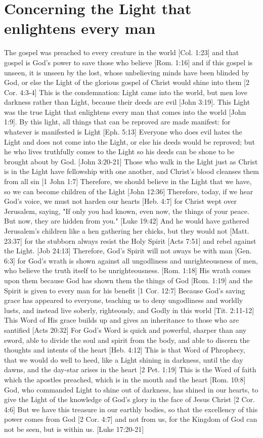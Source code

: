 \documentclass[../main.tex]{subfiles}
\begin{document}
	\section{Concerning the Light that enlightens every man}

	The gospel was preached to every creature in the world [Col. 1:23] and that gospel is God's power to save those who believe [Rom. 1:16] and if this gospel is unseen, it is unseen by the lost, whose unbelieving minds have been blinded by God, or else the Light of the glorious gospel of Christ would shine into them [2 Cor. 4:3-4] This is the condemnation: Light came into the world, but men love darkness rather than Light, because their deeds are evil [John 3:19]. This Light was the true Light that enlightens every man that comes into the world [John 1:9]. By this light, all things that can be reproved are made manifest: for whatever is manifested is Light [Eph. 5:13] Everyone who does evil hates the Light and does not come into the Light, or else his deeds would be reproved; but he who lives truthfully comes to the Light so his deeds can be shone to be brought about by God. [John 3:20-21] Those who walk in the Light just as Christ is in the Light have fellowship with one another, and Christ's blood cleanses them from all sin [1 John 1:7] Therefore, we should believe in the Light that we have, so we can become children of the Light [John 12:36] Therefore, today, if we hear God's voice, we must not harden our hearts [Heb. 4:7] for Christ wept over Jerusalem, saying, "If only you had known, even now,  the things of your peace. But now, they are hidden from you." [Luke 19:42] And he would have gathered Jerusalem's children like a hen gathering her chicks, but they would not [Matt. 23:37] for the stubborn always resist the Holy Spirit [Acts 7:51] and rebel against the Light. [Job 24:13] Therefore, God's Spirit will not aways be with man [Gen. 6:3] for God's wrath is shown against all ungodliness and unrighteousness of men, who believe the truth itself to be unrighteousness. [Rom. 1:18] His wrath comes upon them because God has shown them the things of God [Rom. 1:19] and the Spirit is given to every man for his benefit [1 Cor. 12:7] Because God's saving grace has appeared to everyone, teaching us to deny ungodliness and worldly lusts, and instead live soberly, righteously, and Godly in this world [Tit. 2:11-12] This Word of His grace builds up and gives an inheritance to those who are santified [Acts 20:32] For God's Word is quick and powerful, sharper than any sword, able to divide the soul and spirit from the body, and able to discern the thoughts and intents of the heart [Heb. 4:12] This is that Word of Phrophecy, that we would do well to heed, like a Light shining in darkness, until the day dawns, and the day-star arises in the heart [2 Pet. 1:19] This is the Word of faith which the apostles preached, which is in the mouth and the heart [Rom. 10:8] God, who commanded Light to shine out of darkness, has shined in our hearts, to give the Light of the knowledge of God's glory in the face of Jesus Christ [2 Cor. 4:6] But we have this treasure in our earthly bodies, so that the excellency of this power comes from God [2 Cor. 4:7] and not from us, for the Kingdom of God can not be seen, but is within us. [Luke 17:20-21]
\end{document}
